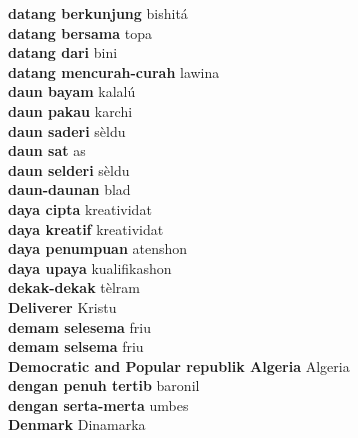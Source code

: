\textbf{ datang berkunjung  } bishitá \\
\textbf{ datang bersama  } topa \\
\textbf{ datang dari  } bini \\
\textbf{ datang mencurah-curah  } lawina \\
\textbf{ daun bayam  } kalalú \\
\textbf{ daun pakau  } karchi \\
\textbf{ daun saderi  } sèldu \\
\textbf{ daun sat  } as \\
\textbf{ daun selderi  } sèldu \\
\textbf{ daun-daunan  } blad \\
\textbf{ daya cipta  } kreatividat \\
\textbf{ daya kreatif  } kreatividat \\
\textbf{ daya penumpuan  } atenshon \\
\textbf{ daya upaya  } kualifikashon \\
\textbf{ dekak-dekak  } tèlram \\
\textbf{ Deliverer  } Kristu \\
\textbf{ demam selesema  } friu \\
\textbf{ demam selsema  } friu \\
\textbf{ Democratic and Popular republik Algeria  } Algeria \\
\textbf{ dengan penuh tertib  } baronil \\
\textbf{ dengan serta-merta  } umbes \\
\textbf{ Denmark  } Dinamarka \\
